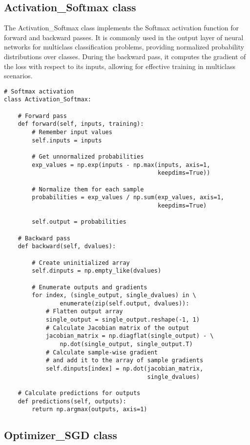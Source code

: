 \documentclass{article}
\begin{document}
\subsection{Activation\_Softmax class}
The Activation\_Softmax class implements the Softmax activation function for forward and backward passes. It is commonly used in the output layer of neural networks for multiclass classification problems, providing normalized probability distributions over classes. During the backward pass, it computes the gradient of the loss with respect to its inputs, allowing for effective training in multiclass scenarios.
\begin{lstlisting}
# Softmax activation
class Activation_Softmax:

    # Forward pass
    def forward(self, inputs, training):
        # Remember input values
        self.inputs = inputs

        # Get unnormalized probabilities
        exp_values = np.exp(inputs - np.max(inputs, axis=1,
                                            keepdims=True))

        # Normalize them for each sample
        probabilities = exp_values / np.sum(exp_values, axis=1,
                                            keepdims=True)

        self.output = probabilities

    # Backward pass
    def backward(self, dvalues):

        # Create uninitialized array
        self.dinputs = np.empty_like(dvalues)

        # Enumerate outputs and gradients
        for index, (single_output, single_dvalues) in \
                enumerate(zip(self.output, dvalues)):
            # Flatten output array
            single_output = single_output.reshape(-1, 1)
            # Calculate Jacobian matrix of the output
            jacobian_matrix = np.diagflat(single_output) - \
                np.dot(single_output, single_output.T)
            # Calculate sample-wise gradient
            # and add it to the array of sample gradients
            self.dinputs[index] = np.dot(jacobian_matrix,
                                         single_dvalues)

    # Calculate predictions for outputs
    def predictions(self, outputs):
        return np.argmax(outputs, axis=1)
\end{lstlisting}

\subsection{Optimizer\_SGD class}
\end{document}
